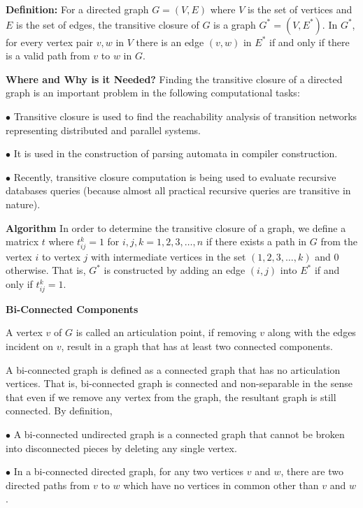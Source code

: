 \vskip 3mm
{\bf Definition:}
\vskip 1mm
For a directed graph $G=(V,E)$ where $V$ is the set of vertices and $E$ is the set of edges, the transitive closure of $G$ is a graph $G^*=(V,E^*)$. In $G^*$, for every vertex pair $v,w$ in $V$ there is an edge $(v,w)$ in $E^*$ if and only if there is a valid path from $v$ to $w$ in $G$.

\vskip 3mm
{\bf Where and Why is it Needed?}
\vskip 1mm
Finding the transitive closure of a directed graph is an important problem in the following computational tasks:

\vskip 3mm
\qquad$\bullet$ Transitive closure is used to find the reachability analysis of transition networks representing distributed and parallel systems.

\vskip 3mm
\qquad$\bullet$ It is used in the construction of parsing automata in compiler construction.

\vskip 3mm
\qquad$\bullet$ Recently, transitive closure computation is being used to evaluate recursive databases queries (because almost all practical recursive queries are transitive in nature).

\vskip 3mm
{\bf Algorithm}
\vskip 1mm
In order to determine the transitive closure of a graph, we define a matricx $t$ where $t^k_{ij}=1$ for $i,j,k=1,2,3,\ldots,n$ if there exists a path in $G$ from the vertex $i$ to vertex $j$ with intermediate vertices in the set $(1,2,3,\ldots,k)$ and $0$ otherwise. That is, $G^*$ is constructed by adding an edge $(i,j)$ into $E^*$ if and only if $t^k_{ij}=1$.

\filbreak
\vskip 1cm
{\bf Bi-Connected Components}

\vskip 1mm
A vertex $v$ of $G$ is called an articulation point, if removing $v$ along with the edges incident on $v$, result in a graph that has at least two connected components.

\vskip 1mm
A bi-connected graph is defined as a connected graph that has no articulation vertices. That is, bi-connected graph is connected and non-separable in the sense that even if we remove any vertex from the graph, the resultant graph is still connected. By definition,

\vskip 3mm
\qquad$\bullet$ A bi-connected undirected graph is a connected graph that cannot be broken into disconnected pieces by deleting any single vertex.

\vskip 3mm
\qquad$\bullet$ In a bi-connected directed graph, for any two vertices $v$ and $w$, there are two directed paths from $v$ to $w$ which have no vertices in common other than $v$ and $w$.

